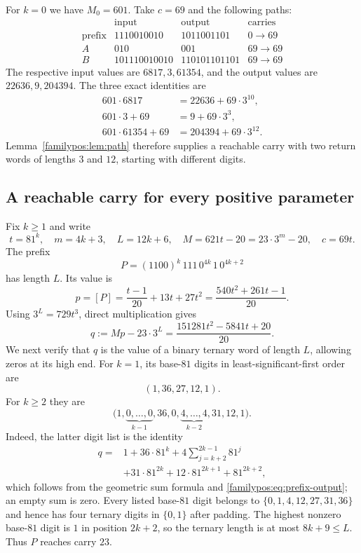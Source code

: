 For $k=0$ we have $M_0=601$. Take $c=69$ and the following paths:
\[
\begin{array}{c|c|c|c}
 &\text{input}&\text{output}&\text{carries}\\\hline
 \text{prefix}&1110010010&1011001101&0\longrightarrow69\\
 A&010&001&69\longrightarrow69\\
 B&101110010010&110101101101&69\longrightarrow69
\end{array}
\]
The respective input values are $6817,3,61354$, and the output
values are $22636,9,204394$. The three exact identities are
\begin{align*}
 601\cdot6817&=22636+69\cdot3^{10},\\
 601\cdot3+69&=9+69\cdot3^3,\\
 601\cdot61354+69&=204394+69\cdot3^{12}.
\end{align*}
Lemma~\ref{familypos:lem:path} therefore supplies a reachable
carry with two return words of lengths $3$ and $12$, starting
with different digits.

\subsection{A reachable carry for every positive parameter}

Fix $k\ge1$ and write
\[
 t=81^k,\quad m=4k+3,\quad L=12k+6,\quad
 M=621t-20=23\cdot3^m-20,\quad c=69t.
\]
The prefix
\begin{equation}\label{familypos:eq:prefix}
        P=(1100)^k\,111\,0^{4k}\,1\,0^{4k+2}
\end{equation}
has length $L$. Its value is
\[
 p=[P]=\frac{t-1}{20}+13t+27t^2
       =\frac{540t^2+261t-1}{20}.
\]
Using $3^L=729t^3$, direct multiplication gives
\begin{equation}\label{familypos:eq:prefix-output}
 q:=Mp-23\cdot3^L
      =\frac{151281t^2-5841t+20}{20}.
\end{equation}
We next verify that $q$ is the value of a binary ternary word of
length $L$, allowing zeros at its high end. For $k=1$, its base-$81$
digits in least-significant-first order are
\[
                         (1,36,27,12,1).
\]
For $k\ge2$ they are
\[
 \bigl(1,\underbrace{0,\ldots,0}_{k-1},36,0,
       \underbrace{4,\ldots,4}_{k-2},31,12,1\bigr).
\]
Indeed, the latter digit list is the identity
\begin{align*}
 q={}&1+36\cdot81^k
       +4\sum_{j=k+2}^{2k-1}81^j\\
    &+31\cdot81^{2k}+12\cdot81^{2k+1}+81^{2k+2},
\end{align*}
which follows from the geometric sum formula and
\eqref{familypos:eq:prefix-output}; an empty sum is zero.
Every listed base-$81$ digit belongs to
$\{0,1,4,12,27,31,36\}$ and hence has four ternary digits
in $\{0,1\}$ after padding. The highest nonzero base-$81$ digit
is $1$ in position $2k+2$, so the ternary length is at most
$8k+9\le L$. Thus $P$ reaches carry $23$.

